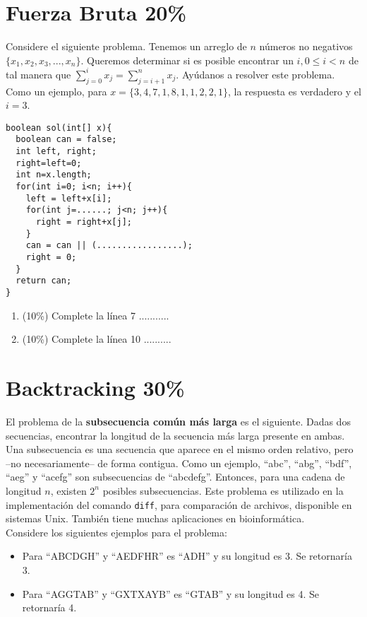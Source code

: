 \documentclass[10 pt]{article}
\begin{document}
\begin{multicols}{2}
\section{Fuerza Bruta 20\%}

Considere el siguiente problema. Tenemos un arreglo de $n$ números no negativos $\{x_1,x_2,x_3, ..., x_n\}$. Queremos determinar si es posible encontrar un $i, 0 \leq i < n$ de tal manera que 
$\sum\limits_{j=0}^{i} x_j = \sum\limits_{j=i+1}^{n} x_j$. Ayúdanos a resolver este problema. Como un ejemplo, para $x = \{3,4,7,1,8,1,1,2,2,1\}$, la respuesta es verdadero y el $i=3$.
\begin{lstlisting}
boolean sol(int[] x){
  boolean can = false;
  int left, right;
  right=left=0;
  int n=x.length;
  for(int i=0; i<n; i++){
    left = left+x[i];
    for(int j=......; j<n; j++){
      right = right+x[j];
    }
    can = can || (.................);
    right = 0;
  }
  return can;
}
\end{lstlisting}
\begin{enumerate}[label=\alph*)]
	\item (10\%) Complete la línea 7 ...........
	\item (10\%) Complete la línea 10 ..........  
\end{enumerate}
\section{Backtracking 30\%}

El problema de la \textbf{subsecuencia común más larga} es el siguiente. Dadas dos secuencias, encontrar la longitud de la secuencia más larga presente en ambas.
Una subsecuencia es una secuencia que aparece en el mismo orden relativo, pero --no necesariamente-- de forma contigua. Como un ejemplo, ``abc'', ``abg'', ``bdf'',
``aeg'' y ``acefg'' son subsecuencias de ``abcdefg''. Entonces, para una cadena de longitud $n$, existen $2^n$ posibles subsecuencias. Este problema es utilizado
en la implementación del comando \texttt{diff}, para comparación de archivos, disponible en sistemas Unix.  También tiene muchas aplicaciones en bioinformática. \\

\noindent
Considere los siguientes ejemplos para el problema:
\begin{itemize}
\item Para ``ABCDGH'' y ``AEDFHR'' es ``ADH'' y su longitud es 3. Se retornaría 3.
\item Para ``AGGTAB'' y ``GXTXAYB'' es ``GTAB'' y su longitud es 4. Se retornaría 4.\\
\end{itemize}


\end{multicols}
\end{document}
